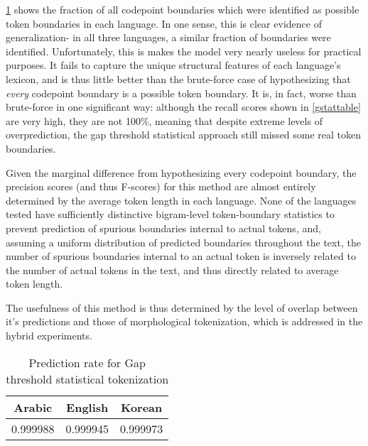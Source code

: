 \ref{gpredtable} shows the fraction of all codepoint boundaries which were identified as possible token boundaries in each language. In one sense, this is clear evidence of generalization- in all three languages, a similar fraction of boundaries were identified. Unfortunately, this is makes the model very nearly useless for practical purposes. It fails to capture the unique structural features of each language's lexicon, and is thus little better than the brute-force case of hypothesizing that \textit{every} codepoint boundary is a possible token boundary. It is, in fact, worse than brute-force in one significant way: although the recall scores shown in \ref{gstattable} are very high, they are not 100\%, meaning that despite extreme levels of overprediction, the gap threshold statistical approach still missed some real token boundaries.

Given the marginal difference from hypothesizing every codepoint boundary, the precision scores (and thus F-scores) for this method are almost entirely determined by the average token length in each language. None of the languages tested have sufficiently distinctive bigram-level token-boundary statistics to prevent prediction of spurious boundaries internal to actual tokens, and, assuming a uniform distribution of predicted boundaries throughout the text, the number of spurious boundaries internal to an actual token is inversely related to the number of actual tokens in the text, and thus directly related to average token length.

The usefulness of this method is thus determined by the level of overlap between it's predictions and those of morphological tokenization, which is addressed in the hybrid experiments.

\begin{table}
	\centering
	\begin{tabular}{| c | c | c |}
		\hline
		Arabic & English & Korean \\ \hline
		0.999988 & 0.999945 & 0.999973 \\ \hline
	\end{tabular}
	\caption{Prediction rate for Gap threshold statistical tokenization}
	\label{gpredtable}
\end{table}

